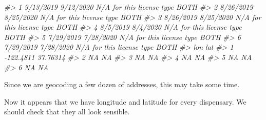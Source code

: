 \documentclass[
  12pt,
]{book}
\newenvironment{Shaded}{\begin{snugshade}}{\end{snugshade}}
\newcommand{\CommentTok}[1]{\textcolor[rgb]{0.56,0.35,0.01}{\textit{#1}}}
\newcommand{\ControlFlowTok}[1]{\textcolor[rgb]{0.13,0.29,0.53}{\textbf{#1}}}
\newcommand{\DecValTok}[1]{\textcolor[rgb]{0.00,0.00,0.81}{#1}}
\newcommand{\KeywordTok}[1]{\textcolor[rgb]{0.13,0.29,0.53}{\textbf{#1}}}
\newcommand{\NormalTok}[1]{#1}
\newcommand{\OperatorTok}[1]{\textcolor[rgb]{0.81,0.36,0.00}{\textbf{#1}}}
\newcommand{\StringTok}[1]{\textcolor[rgb]{0.31,0.60,0.02}{#1}}
\begin{document}
\begin{Shaded}
\begin{Highlighting}[]
\CommentTok{\#> 1  9/13/2019       9/12/2020 N/A for this license type                BOTH}
\CommentTok{\#> 2  8/26/2019       8/25/2020 N/A for this license type                BOTH}
\CommentTok{\#> 3  8/26/2019       8/25/2020 N/A for this license type                BOTH}
\CommentTok{\#> 4   8/5/2019        8/4/2020 N/A for this license type                BOTH}
\CommentTok{\#> 5  7/29/2019       7/28/2020 N/A for this license type                BOTH}
\CommentTok{\#> 6  7/29/2019       7/28/2020 N/A for this license type                BOTH}
\CommentTok{\#>         lon      lat}
\CommentTok{\#> 1 {-}122.4811 37.76314}
\CommentTok{\#> 2        NA       NA}
\CommentTok{\#> 3        NA       NA}
\CommentTok{\#> 4        NA       NA}
\CommentTok{\#> 5        NA       NA}
\CommentTok{\#> 6        NA       NA}
\end{Highlighting}
\end{Shaded}

Since we are geocoding a few dozen of addresses, this may take some time.

\begin{Shaded}
\end{Shaded}

Now it appears that we have longitude and latitude for every dispensary. We should check that they all look sensible.

\begin{Shaded}
\end{Shaded}

\begin{Shaded}
\end{Shaded}
\end{document}
